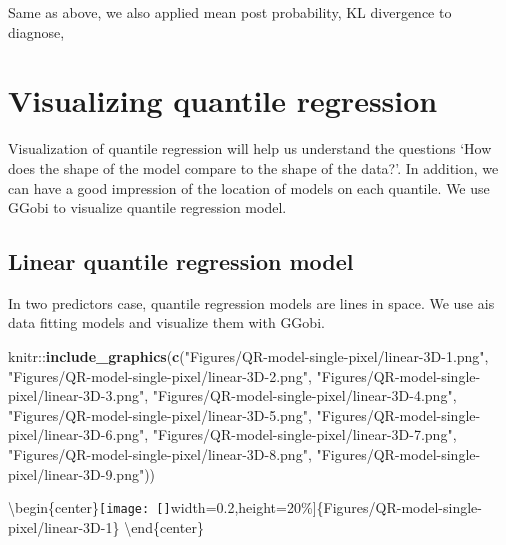 \documentclass[11pt,a4paper,]{article}
\newenvironment{Shaded}{\begin{snugshade}}{\end{snugshade}}
\newcommand{\KeywordTok}[1]{\textcolor[rgb]{0.13,0.29,0.53}{\textbf{{#1}}}}
\newcommand{\StringTok}[1]{\textcolor[rgb]{0.31,0.60,0.02}{{#1}}}
\newcommand{\NormalTok}[1]{{#1}}
\theoremstyle{definition}
\theoremstyle{definition}
\theoremstyle{remark}
\begin{document}
Same as above, we also applied mean post probability, KL divergence to
diagnose,

\section{Visualizing quantile
regression}\label{visualizing-quantile-regression}

Visualization of quantile regression will help us understand the
questions `How does the shape of the model compare to the shape of the
data?'. In addition, we can have a good impression of the location of
models on each quantile. We use GGobi to visualize quantile regression
model.

\subsection{Linear quantile regression
model}\label{linear-quantile-regression-model}

In two predictors case, quantile regression models are lines in space.
We use ais data fitting models and visualize them with GGobi.

\begin{Shaded}
\begin{Highlighting}[]
\NormalTok{knitr::}\KeywordTok{include_graphics}\NormalTok{(}\KeywordTok{c}\NormalTok{(}\StringTok{"Figures/QR-model-single-pixel/linear-3D-1.png"}\NormalTok{,}
                          \StringTok{"Figures/QR-model-single-pixel/linear-3D-2.png"}\NormalTok{,}
                          \StringTok{"Figures/QR-model-single-pixel/linear-3D-3.png"}\NormalTok{,}
                          \StringTok{"Figures/QR-model-single-pixel/linear-3D-4.png"}\NormalTok{,}
                          \StringTok{"Figures/QR-model-single-pixel/linear-3D-5.png"}\NormalTok{,}
                          \StringTok{"Figures/QR-model-single-pixel/linear-3D-6.png"}\NormalTok{,}
                          \StringTok{"Figures/QR-model-single-pixel/linear-3D-7.png"}\NormalTok{,}
                          \StringTok{"Figures/QR-model-single-pixel/linear-3D-8.png"}\NormalTok{,}
                          \StringTok{"Figures/QR-model-single-pixel/linear-3D-9.png"}\NormalTok{))}
\end{Highlighting}
\end{Shaded}

\textbackslash{}begin\{center\}\texttt{[image: []}width=0.2\linewidth,height=20\%{]}\{Figures/QR-model-single-pixel/linear-3D-1\}
\textbackslash{}end\{center\}
\end{document}

